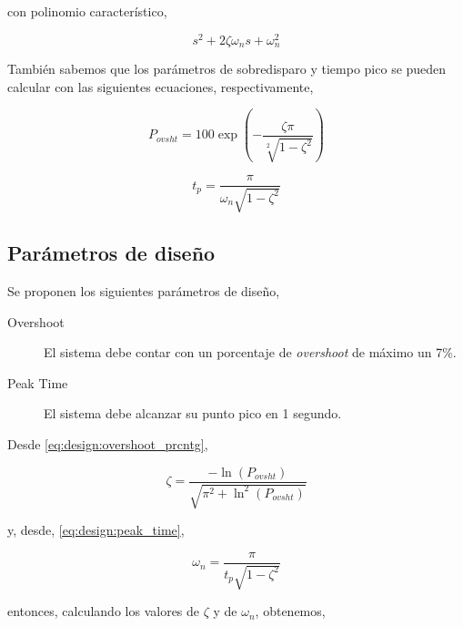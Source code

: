 \documentclass[12pt,a4paper]{article}
\begin{document}
        con polinomio característico, 

        \begin{equation}
          s^{2} + 2\zeta\omega_{n}s + \omega_{n}^{2}
          \label{eq:design:2ndorder_std_charact}
        \end{equation}

        También sabemos que los parámetros de sobredisparo y tiempo pico se pueden calcular con las siguientes ecuaciones, 
        respectivamente, 

        \begin{equation}
          P_{ovsht} = 100\exp\left(-\frac{\zeta\pi}{\sqrt[2]{1-\zeta^{2}}}\right)
          \label{eq:design:overshoot_prcntg}
        \end{equation}

        \begin{equation}
          t_{p} = \frac{\pi}{\omega_{n}\sqrt{1-\zeta^{2}}}
          \label{eq:design:peak_time}
        \end{equation}

        \subsection{Parámetros de diseño}

        Se proponen los siguientes parámetros de diseño,

        \begin{description}
          \item[Overshoot] El sistema debe contar con un porcentaje de \emph{overshoot} de máximo un 7\%. 
          \item[Peak Time] El sistema debe alcanzar su punto pico en 1 segundo. 
        \end{description}
        
         Desde \ref{eq:design:overshoot_prcntg}, 

        \begin{equation}
        \zeta = \frac{-\ln\left(P_{ovsht}\right)}{\sqrt{\pi^{2} + \ln^{2}\left(P_{ovsht}\right)}}
        \end{equation}

        y, desde, \ref{eq:design:peak_time}, 

        \begin{equation}
          \omega_{n} = \frac{\pi}{t_{p}\sqrt{1-\zeta^{2}}}
        \end{equation}
        
        entonces, calculando los valores de $ \zeta $ y de $ \omega_{n} $, obtenemos, 
\end{document}
